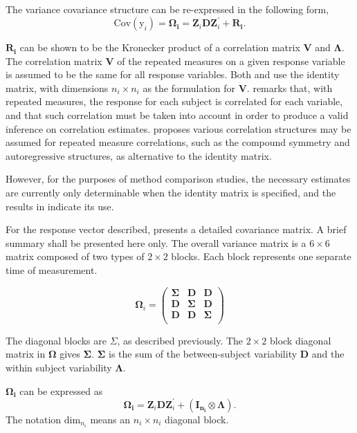 \documentclass[12pt, a4paper]{report}
\theoremstyle{plain}
\theoremstyle{definition}
\theoremstyle{remark}
\begin{document}
The variance covariance structure can be re-expressed in the following form,
\[
\mbox{Cov}(\mbox{y}_{i}) = \boldsymbol{\Omega_{i}} = \boldsymbol{Z}_{i}\boldsymbol{D}\boldsymbol{Z}_{i}^\prime + \boldsymbol{R_{i}}.
\]

$\boldsymbol{R_{i}}$ can be shown to be the Kronecker product of a correlation matrix $\boldsymbol{V}$ and $\boldsymbol{\Lambda}$. The correlation matrix $\boldsymbol{V}$ of the repeated measures on a given response variable is assumed to be the same for all response variables. Both \citet{hamlett} and \citet{lam} use the identity matrix, with dimensions $n_{i} \times n_{i}$ as the formulation for $\boldsymbol{V}$. \citet{roy} remarks that, with repeated measures, the response for each subject is correlated for each variable, and that such correlation must be taken into account in order to produce a valid inference on correlation estimates.  \citet{roy2006} proposes various correlation structures may be assumed for repeated measure correlations, such as the compound symmetry and autoregressive structures, as alternative to the identity matrix.

However, for the purposes of method comparison studies, the necessary estimates are currently only determinable when the identity matrix is specified, and the results in \citet{roy} indicate its use.

For the response vector described, \citet{hamlett} presents a detailed covariance matrix. A brief summary shall be presented here only. The overall variance matrix is a $6 \times 6$ matrix composed of two types of $2 \times 2$ blocks. Each block represents one separate time of measurement.

\[
\boldsymbol{\Omega}_{i} = \left(
\begin{array}{ccc}
  \boldsymbol{\Sigma} & \boldsymbol{D} & \boldsymbol{D}\\
  \boldsymbol{D} & \boldsymbol{\Sigma} & \boldsymbol{D}\\
  \boldsymbol{D} & \boldsymbol{D} & \boldsymbol{\Sigma}\\
\end{array}\right)
\]

The diagonal blocks are $\Sigma$, as described previously. The $2 \times 2$ block diagonal matrix in $\boldsymbol{\Omega}$ gives $\boldsymbol{\Sigma}$. $\boldsymbol{\Sigma}$ is the sum of the between-subject variability $\boldsymbol{D}$ and the within subject variability $\boldsymbol{\Lambda}$.

$\boldsymbol{\Omega_{i}}$ can be expressed as
\[
\boldsymbol{\Omega_{i}} = \boldsymbol{Z}_{i}\boldsymbol{D}\boldsymbol{Z}_{i}^\prime + ({\boldsymbol{I_{n_{i}}} \otimes \boldsymbol{\Lambda}}).
\]
The notation $\mbox{dim}_{n_{i}}$ means an $n_{i} \times n_{i}$ diagonal block.
\end{document}
